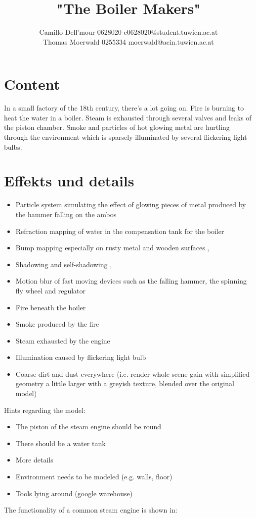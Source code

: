 \documentclass{scrartcl}
\title{"The Boiler Makers"}
\author{Camillo Dell'mour 0628020 e0628020@student.tuwien.ac.at\\ Thomas Moerwald 0255334 moerwald@acin.tuwien.ac.at}
\begin{document}
\maketitle

\section{Content}
In a small factory of the 18th century, there's a lot going on. Fire is burning to heat the water in a boiler. Steam is exhausted through several valves and leaks of the piston chamber. Smoke and particles of hot glowing metal are hurtling through the environment which is sparsely illuminated by several flickering light bulbs.

\section{Effekts und details}
\begin{itemize}
	\item Particle system simulating the effect of glowing pieces of metal produced by the hammer falling on the ambos \cite{van2000building}
	\item Refraction mapping of water in the compensation tank for the boiler \cite{vlachos2000refraction}
	\item Bump mapping especially on rusty metal and wooden surfaces \cite{moeller1999realtime}, \cite{dietrich2000hardware}
	\item Shadowing and self-shadowing \cite{nagy2000realtime}, \cite{ing2000ground}
	\item Motion blur of fast moving devices such as the falling hammer, the spinning fly wheel and regulator \cite{rosado2007motion}
	\item Fire beneath the boiler %
	\item Smoke produced by the fire %
	\item Steam exhausted by the engine
	\item Illumination caused by flickering light bulb
	\item Coarse dirt and dust everywhere (i.e. render whole scene gain with simplified geometry a little larger with a greyish texture, blended over the original model)
\end{itemize}

Hints regarding the model:
\begin{itemize}
	\item The piston of the steam engine should be round
	\item There should be a water tank
	\item More details
	\item Environment needs to be modeled (e.g. walls, floor)
	\item Tools lying around (google warehouse)
\end{itemize}
The functionality of a common steam engine is shown in:

% 
 
\end{document}
